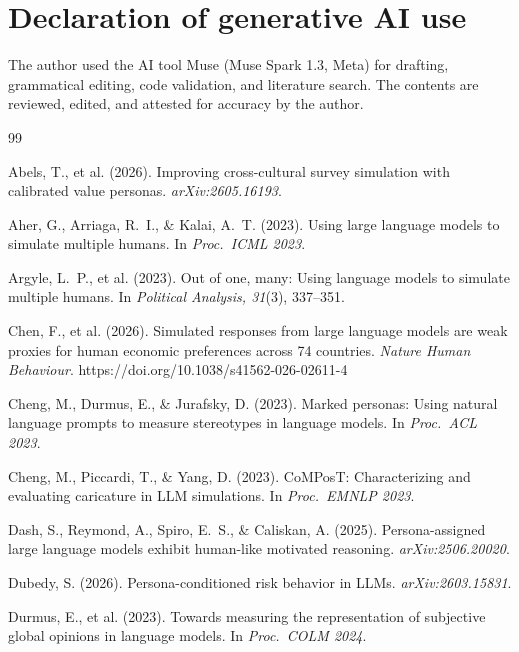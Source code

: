 \documentclass[10pt,letterpaper]{article}
\begin{document}
\section*{Declaration of generative AI use}

The author used the AI tool Muse (Muse Spark 1.3, Meta) for drafting,
grammatical editing, code validation, and literature search. The contents
are reviewed, edited, and attested for accuracy by the author.

\begin{thebibliography}{99}

Abels, T., et al. (2026). Improving cross-cultural survey simulation with
calibrated value personas. \textit{arXiv:2605.16193}.

Aher, G., Arriaga, R.~I., \& Kalai, A.~T. (2023). Using large language models
to simulate multiple humans. In \textit{Proc.\ ICML 2023}.

Argyle, L.~P., et al. (2023). Out of one, many: Using language models to
simulate multiple humans. In \textit{Political Analysis, 31}(3), 337--351.

Chen, F., et al. (2026). Simulated responses from large language models are
weak proxies for human economic preferences across 74 countries.
\textit{Nature Human Behaviour}.
https://doi.org/10.1038/s41562-026-02611-4

Cheng, M., Durmus, E., \& Jurafsky, D. (2023). Marked personas: Using
natural language prompts to measure stereotypes in language models.
In \textit{Proc.\ ACL 2023}.

Cheng, M., Piccardi, T., \& Yang, D. (2023). CoMPosT: Characterizing and
evaluating caricature in LLM simulations. In \textit{Proc.\ EMNLP 2023}.

Dash, S., Reymond, A., Spiro, E.~S., \& Caliskan, A. (2025).
Persona-assigned large language models exhibit human-like motivated
reasoning. \textit{arXiv:2506.20020}.

Dubedy, S. (2026). Persona-conditioned risk behavior in LLMs.
\textit{arXiv:2603.15831}.

Durmus, E., et al. (2023). Towards measuring the representation of subjective
global opinions in language models. In \textit{Proc.\ COLM 2024}.


\end{thebibliography}
\end{document}
